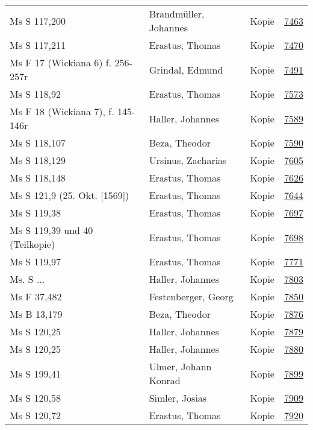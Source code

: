 \documentclass[10pt,a4paper,landscape]{report}
\begin{document}
\begin{longtable}{p{16cm}p{4cm}lr}
Ms S 117,200	&	Brandmüller, Johannes	&	Kopie	&	\href{http://130.60.24.72/assignment/7463}{7463}\\
Ms S 117,211	&	Erastus, Thomas	&	Kopie	&	\href{http://130.60.24.72/assignment/7470}{7470}\\
Ms F 17 (Wickiana 6) f. 256-257r	&	Grindal, Edmund	&	Kopie	&	\href{http://130.60.24.72/assignment/7491}{7491}\\
Ms S 118,92	&	Erastus, Thomas	&	Kopie	&	\href{http://130.60.24.72/assignment/7573}{7573}\\
Ms F 18 (Wickiana 7), f. 145-146r	&	Haller, Johannes	&	Kopie	&	\href{http://130.60.24.72/assignment/7589}{7589}\\
Ms S 118,107	&	Beza, Theodor	&	Kopie	&	\href{http://130.60.24.72/assignment/7590}{7590}\\
Ms S 118,129	&	Ursinus, Zacharias	&	Kopie	&	\href{http://130.60.24.72/assignment/7605}{7605}\\
Ms S 118,148	&	Erastus, Thomas	&	Kopie	&	\href{http://130.60.24.72/assignment/7626}{7626}\\
Ms S 121,9 (25. Okt. [1569])	&	Erastus, Thomas	&	Kopie	&	\href{http://130.60.24.72/assignment/7644}{7644}\\
Ms S 119,38	&	Erastus, Thomas	&	Kopie	&	\href{http://130.60.24.72/assignment/7697}{7697}\\
Ms S 119,39 und 40 (Teilkopie)	&	Erastus, Thomas	&	Kopie	&	\href{http://130.60.24.72/assignment/7698}{7698}\\
Ms S 119,97	&	Erastus, Thomas	&	Kopie	&	\href{http://130.60.24.72/assignment/7771}{7771}\\
Ms. S ...	&	Haller, Johannes	&	Kopie	&	\href{http://130.60.24.72/assignment/7803}{7803}\\
Ms F 37,482	&	Festenberger, Georg	&	Kopie	&	\href{http://130.60.24.72/assignment/7850}{7850}\\
Ms B 13,179	&	Beza, Theodor	&	Kopie	&	\href{http://130.60.24.72/assignment/7876}{7876}\\
Ms S 120,25	&	Haller, Johannes	&	Kopie	&	\href{http://130.60.24.72/assignment/7879}{7879}\\
Ms S 120,25	&	Haller, Johannes	&	Kopie	&	\href{http://130.60.24.72/assignment/7880}{7880}\\
Ms S 199,41	&	Ulmer, Johann Konrad	&	Kopie	&	\href{http://130.60.24.72/assignment/7899}{7899}\\
Ms S 120,58	&	Simler, Josias	&	Kopie	&	\href{http://130.60.24.72/assignment/7909}{7909}\\
Ms S 120,72	&	Erastus, Thomas	&	Kopie	&	\href{http://130.60.24.72/assignment/7920}{7920}\\

\end{longtable}
\end{document}
